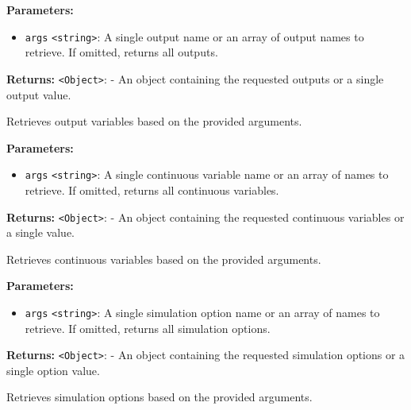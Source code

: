 \documentclass[12pt,a4paper]{article}
\begin{document}
\noindent \textbf{Parameters:}
\begin{itemize}
  \item \texttt{args} \texttt{<string>}: A single output name or an array of output names to retrieve. If omitted, returns all outputs.
\end{itemize}

\noindent \textbf{Returns:} \texttt{<Object>}: - An object containing the requested outputs or a single output value.

\noindent Retrieves output variables based on the provided arguments.

\vspace{5mm}
\noindent {}


\noindent \textbf{Parameters:}
\begin{itemize}
  \item \texttt{args} \texttt{<string>}: A single continuous variable name or an array of names to retrieve. If omitted, returns all continuous variables.
\end{itemize}

\noindent \textbf{Returns:} \texttt{<Object>}: - An object containing the requested continuous variables or a single value.

\noindent Retrieves continuous variables based on the provided arguments.

\vspace{5mm}
\noindent {}


\noindent \textbf{Parameters:}
\begin{itemize}
  \item \texttt{args} \texttt{<string>}: A single simulation option name or an array of names to retrieve. If omitted, returns all simulation options.
\end{itemize}

\noindent \textbf{Returns:} \texttt{<Object>}: - An object containing the requested simulation options or a single option value.

\noindent Retrieves simulation options based on the provided arguments.

\vspace{5mm}
\noindent {}
\end{document}
